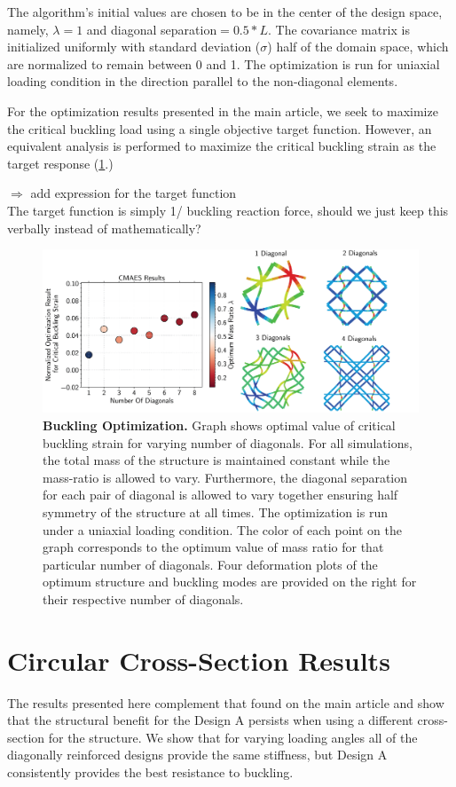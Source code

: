 \documentclass[10pt,twoside]{fernandes_supp}
\newcommand{\KB}[1]{\noindent\color{blue}$\Longrightarrow$ #1\normalcolor}
\newcommand{\mf}[1]{\colorbox{blue!10}{\color{color3}#1}}
\begin{document}
The algorithm's initial values are chosen to be in the center of the design space, namely, $\lambda=1$ and diagonal separation$=0.5*L$. The covariance matrix is initialized uniformly with standard deviation ($\sigma$) half of the domain space, which are normalized to remain between 0 and 1. The optimization is run for uniaxial loading condition in the direction parallel to the non-diagonal elements. 

For the optimization results presented in the main article, we seek to maximize the critical buckling load using a single objective target function. However, an equivalent analysis is performed to maximize the critical buckling strain as the target response (\cref{BucklingOptimization}.) 

\KB{add expression for the target function} 
\\\mf{The target function is simply 1/ buckling reaction force, should we just keep this verbally instead of mathematically?}

\begin{figure}
    \centering
    \includegraphics[width=0.9\linewidth]{SFig6.png}
    \caption{{\bf Buckling Optimization.} Graph shows optimal value of critical buckling strain for varying number of diagonals. For all simulations, the total mass of the structure is maintained constant while the mass-ratio is allowed to vary. Furthermore, the diagonal separation for each pair of diagonal is allowed to vary together ensuring half symmetry of the structure at all times. The optimization is run under a uniaxial loading condition. The color of each point on the graph corresponds to the optimum value of mass ratio for that particular number of diagonals. Four deformation plots of the optimum structure and buckling modes are provided on the right for their respective number of diagonals.}
    \label{BucklingOptimization}
\end{figure}

\section{Circular Cross-Section Results}
The results presented here complement that found on the main article and show that the structural benefit for the Design A persists when using a different cross-section for the structure. We show that for varying loading angles all of the diagonally reinforced designs provide the same stiffness, but Design A consistently provides the best resistance to buckling. 
\end{document}
